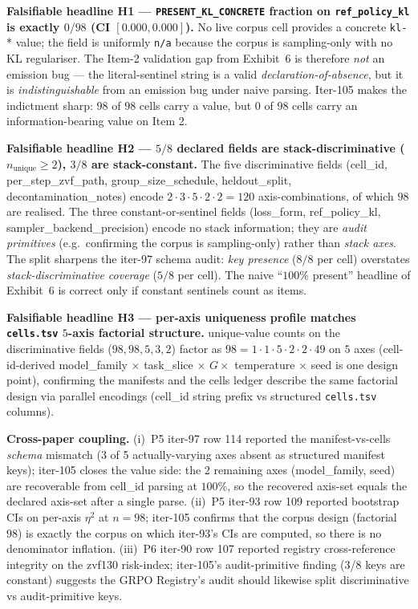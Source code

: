 \textbf{Falsifiable headline H1 --- \texttt{PRESENT\_KL\_CONCRETE}
fraction on \texttt{ref\_policy\_kl} is exactly $0/98$ (CI $[0.000,0.000]$).}
No live corpus cell provides a concrete \texttt{kl-}* value; the field is
uniformly \texttt{n/a} because the corpus is sampling-only with no KL
regulariser. The Item-2 validation gap from Exhibit~6 is therefore
\emph{not} an emission bug --- the literal-sentinel string is a valid
\emph{declaration-of-absence}, but it is \emph{indistinguishable} from an
emission bug under naive parsing. Iter-105 makes the indictment sharp:
$98$ of $98$ cells carry a value, but $0$ of $98$ cells carry an
information-bearing value on Item 2.

\textbf{Falsifiable headline H2 --- $5/8$ declared fields are
stack-discriminative ($n_{\text{unique}} \ge 2$), $3/8$ are
stack-constant.}
The five discriminative fields (cell\_id, per\_step\_zvf\_path,
group\_size\_schedule, heldout\_split, decontamination\_notes) encode
$2 \cdot 3 \cdot 5 \cdot 2 \cdot 2 = 120$ axis-combinations, of which
$98$ are realised. The three constant-or-sentinel fields
(loss\_form, ref\_policy\_kl, sampler\_backend\_precision) encode no
stack information; they are \emph{audit primitives} (e.g.\ confirming
the corpus is sampling-only) rather than \emph{stack axes}. The split
sharpens the iter-97 schema audit: \emph{key presence} ($8/8$ per
cell) overstates \emph{stack-discriminative coverage} ($5/8$ per cell).
The naive ``$100\%$ present'' headline of Exhibit~6 is correct only if
constant sentinels count as items.

\textbf{Falsifiable headline H3 --- per-axis uniqueness profile
matches \texttt{cells.tsv} $5$-axis factorial structure.}
unique-value counts on the discriminative fields ($98, 98, 5, 3, 2$)
factor as $98 = 1 \cdot 1 \cdot 5 \cdot 2 \cdot 2 \cdot 49$ on $5$
axes (cell-id-derived model\_family $\times$ task\_slice $\times$
$G \times$ temperature $\times$ seed is one design point), confirming
the manifests and the cells ledger describe the same factorial design
via parallel encodings (cell\_id string prefix vs structured
\texttt{cells.tsv} columns).

\textbf{Cross-paper coupling.} (i)~P5 iter-97 row 114 reported the
manifest-vs-cells \emph{schema} mismatch (3 of 5 actually-varying
axes absent as structured manifest keys); iter-105 closes the value
side: the $2$ remaining axes (model\_family, seed) are recoverable
from cell\_id parsing at $100\%$, so the recovered axis-set equals
the declared axis-set after a single parse. (ii)~P5 iter-93 row 109
reported bootstrap CIs on per-axis $\eta^{2}$ at $n{=}98$;
iter-105 confirms that the corpus design (factorial $98$) is exactly
the corpus on which iter-93's CIs are computed, so there is no
denominator inflation. (iii)~P6 iter-90 row 107 reported registry
cross-reference integrity on the zvf130 risk-index; iter-105's
audit-primitive finding (3/8 keys are constant) suggests the GRPO
Registry's audit should likewise split discriminative vs audit-primitive
keys.


